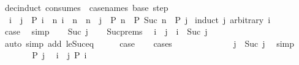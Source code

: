 \begin{isabellebody}
\begin{isamarkuptext}
\end{isamarkuptext}\isamarkuptrue%
\isamarkupfalse%
\ dec{\isacharunderscore}{\kern0pt}induct\ {\isacharbrackleft}{\kern0pt}consumes\ {}{\isacharcomma}{\kern0pt}\ case{\isacharunderscore}{\kern0pt}names\ base\ step{\isacharbrackright}{\kern0pt}{\isacharcolon}{\kern0pt}\isanewline
\ \ {\isachardoublequoteopen}i\ {\isasymle}\ j\ {\isasymLongrightarrow}\ P\ i\ {\isasymLongrightarrow}\ {\isacharparenleft}{\kern0pt}{\isasymAnd}n{\isachardot}{\kern0pt}\ i\ {\isasymle}\ n\ {\isasymLongrightarrow}\ n\ {\isacharless}{\kern0pt}\ j\ {\isasymLongrightarrow}\ P\ n\ {\isasymLongrightarrow}\ P\ {\isacharparenleft}{\kern0pt}Suc\ n{\isacharparenright}{\kern0pt}{\isacharparenright}{\kern0pt}\ {\isasymLongrightarrow}\ P\ j{\isachardoublequoteclose}\isanewline
%
\isadelimproof
%
\endisadelimproof
%
\isatagproof
{}\isamarkupfalse%
\ {\isacharparenleft}{\kern0pt}induct\ j\ arbitrary{\isacharcolon}{\kern0pt}\ i{\isacharparenright}{\kern0pt}\isanewline
\ \ \isamarkupfalse%
\ {}\isanewline
\ \ \isamarkupfalse%
\ \isamarkupfalse%
\ {\isacharquery}{\kern0pt}case\ \isamarkupfalse%
\ simp\isanewline
{}\isamarkupfalse%
\isanewline
\ \ \isamarkupfalse%
\ {\isacharparenleft}{\kern0pt}Suc\ j{\isacharparenright}{\kern0pt}\isanewline
\ \ \isamarkupfalse%
\ Suc{\isachardot}{\kern0pt}prems\ \isamarkupfalse%
\ {\isachardoublequoteopen}i\ {\isasymle}\ j{\isachardoublequoteclose}\ {\isacharbar}{\kern0pt}\ {\isachardoublequoteopen}i\ {\isacharequal}{\kern0pt}\ Suc\ j{\isachardoublequoteclose}\isanewline
\ \ \ \ \isamarkupfalse%
\ {\isacharparenleft}{\kern0pt}auto\ simp\ add{\isacharcolon}{\kern0pt}\ le{\isacharunderscore}{\kern0pt}Suc{\isacharunderscore}{\kern0pt}eq{\isacharparenright}{\kern0pt}\isanewline
\ \ \isamarkupfalse%
\ \isamarkupfalse%
\ {\isacharquery}{\kern0pt}case\isanewline
\ \ \isamarkupfalse%
\ cases\isanewline
\ \ \ \ \isamarkupfalse%
\ {}\isanewline
\ \ \ \ \isamarkupfalse%
\ \isamarkupfalse%
\ {\isachardoublequoteopen}j\ {\isacharless}{\kern0pt}\ Suc\ j{\isachardoublequoteclose}\ \isamarkupfalse%
\ simp\isanewline
\ \ \ \ \isamarkupfalse%
\ \isamarkupfalse%
\ {\isachardoublequoteopen}P\ j{\isachardoublequoteclose}\ \isamarkupfalse%
\ {\isacartoucheopen}i\ {\isasymle}\ j{\isacartoucheclose}\ {\isacartoucheopen}P\ i{\isacartoucheclose}\isanewline

\end{isabellebody}
